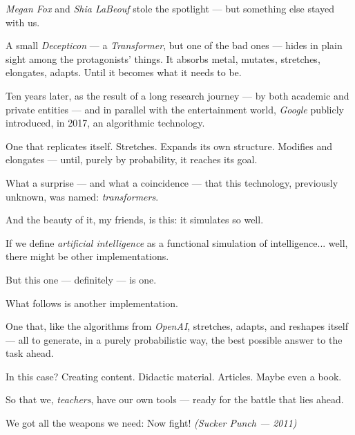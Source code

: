 \documentclass[12pt,a4paper]{article}
\begin{document}
\medskip

\emph{Megan Fox} and \emph{Shia LaBeouf} stole the spotlight — but something else stayed with us.

\medskip

A small \emph{Decepticon} — a \emph{Transformer}, but one of the bad ones — hides in plain sight among the protagonists’ things. It absorbs metal, mutates, stretches, elongates, adapts. Until it becomes what it needs to be.

\bigskip

Ten years later, as the result of a long research journey — by both academic and private entities — and in parallel with the entertainment world, \emph{Google} publicly introduced, in 2017, an algorithmic technology.

\medskip

One that replicates itself. Stretches. Expands its own structure. Modifies and elongates — until, purely by probability, it reaches its goal.

\medskip

What a surprise — and what a coincidence — that this technology, previously unknown, was named: \emph{transformers}.

\bigskip

And the beauty of it, my friends, is this: it simulates so well.

\medskip

If we define \emph{artificial intelligence} as a functional simulation of intelligence... well, there might be other implementations.

\medskip

But this one — definitely — is one.

\bigskip

What follows is another implementation.

\medskip

One that, like the algorithms from \emph{OpenAI}, stretches, adapts, and reshapes itself — all to generate, in a purely probabilistic way, the best possible answer to the task ahead.

\medskip

In this case? Creating content. Didactic material. Articles. Maybe even a book.

\medskip

So that we, \emph{teachers}, have our own tools — ready for the battle that lies ahead.  

\medskip

We got all the weapons we need: Now fight!  \hfill\textit{(Sucker Punch — 2011)}
\end{document}

